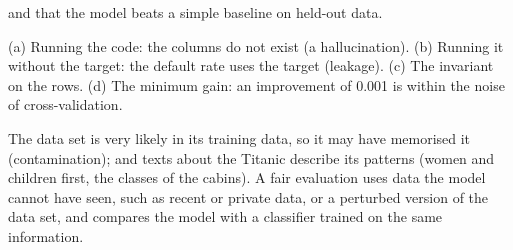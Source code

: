\begin{description}[font=\bfseries,leftmargin=0pt,itemsep=5pt]
        and that the model beats a simple baseline on held-out data.
  \item[\ref{exr4:verify}] (a) Running the code: the columns do not exist (a hallucination). (b) Running it without the
        target: the default rate uses the target (leakage). (c) The invariant on the rows. (d) The minimum gain: an
        improvement of 0.001 is within the noise of cross-validation.
  \item[\ref{exr4:memorise}] The data set is very likely in its training data, so it may have memorised it
        (contamination); and texts about the Titanic describe its patterns (women and children first, the classes of the
        cabins). A fair evaluation uses data the model cannot have seen, such as recent or private data, or a perturbed
        version of the data set, and compares the model with a classifier trained on the same information.
\end{description}


